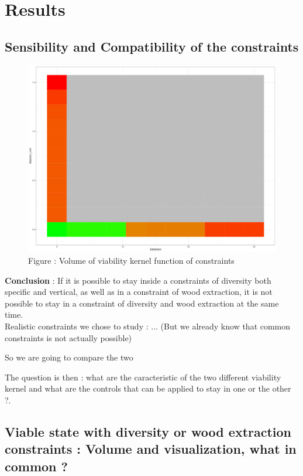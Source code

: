 \documentclass{article}
\begin{document}
\section{Results}

\subsection{Sensibility and Compatibility of the constraints}

\begin{figure}[h]
    \centering
    \includegraphics[width=\textwidth]{Figure/Sensi_ext_shvert.png}
    \caption{Figure : Volume of viability kernel function of constraints}
    \label{fig:sensi}
\end{figure}

\textbf{Conclusion} : If it is possible to stay inside a constraints of diversity both specific and vertical, as well as in a constraint of wood extraction, it is not possible to stay in a constraint of diversity and wood extraction at the same time.\\

Realistic constraints we chose to study : ... (But we already know that common constraints is not actually possible)

So we are going to compare the two

The question is then : what are the caracteristic of the two different viability kernel and what are the controls that can be applied to stay in one or the other ?.\\

\subsection{Viable state with diversity or wood extraction constraints : Volume and visualization, what in common ?}
\end{document}
